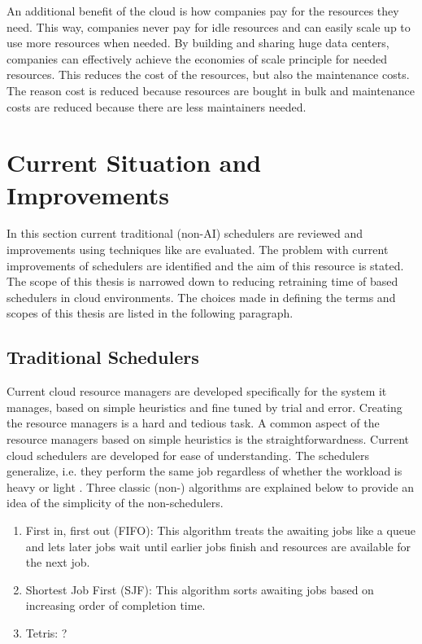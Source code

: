 An additional benefit of the cloud is how companies pay for the resources they
need. This way, companies never pay for idle resources and can easily scale up
to use more resources when needed. By building and sharing huge data centers,
companies can effectively achieve the economies of scale principle for needed
resources. This reduces the cost of the resources, but also the maintenance
costs. The reason cost is reduced because resources are bought in bulk and
maintenance costs are reduced because there are less maintainers needed.


\section{Current Situation and Improvements}\label{sec:situ}

In this section current traditional (non-AI) schedulers are reviewed and
improvements using \ai techniques like \rl are
evaluated. The problem with current \ai improvements of schedulers are
identified and the aim of this resource is stated. The scope of this thesis is
narrowed down to reducing retraining time of \rl based schedulers in cloud
environments. The choices made in defining the terms and scopes of this thesis
are listed in the following paragraph.

\subsection{Traditional Schedulers}

Current cloud resource managers are developed specifically for the system it
manages, based on simple heuristics and fine tuned by trial and error.
Creating the resource managers is a hard and tedious task. A common aspect of
the resource managers based on simple heuristics is the straightforwardness.
Current cloud schedulers are developed for ease of understanding. The
schedulers generalize, i.e. they perform the same job regardless of whether
the workload is heavy or light \cite{mao2019}. Three classic (non-\ai)
algorithms are explained below to provide an idea of the simplicity of the
non-\ai schedulers.

\begin{enumerate}
\item First in, first out (FIFO): This algorithm treats the awaiting jobs like
    a queue and lets later jobs wait until earlier jobs finish and resources
    are available for the next job.
\item Shortest Job First (SJF): This algorithm sorts awaiting jobs based on
    increasing order of completion time.
\item Tetris: ? 
\end{enumerate}

